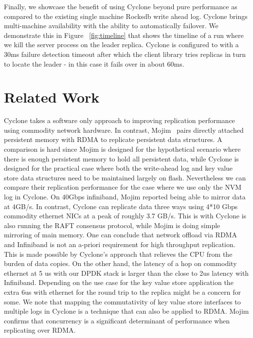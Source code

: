 \documentclass[pageno]{jpaper}
\begin{document}
Finally, we showcase the benefit of using Cyclone beyond pure performance as
compared to the existing single machine Rocksdb write ahead log. Cyclone brings
multi-machine availability with the ability to automatically failover. We
demonstrate this in Figure ~\ref{fig:timeline} that shows the timeline of a run
where we kill the server process on the leader replica. Cyclone is configured to
with a 30ms failure detection timeout after which the client library tries
replicas in turn to locate the leader - in this case it fails over in about
60ms.

\section{Related Work}

Cyclone takes a software only approach to improving replication performance
using commodity network hardware. In contrast, Mojim~\cite{mojim} pairs directly
attached persistent memory with RDMA to replicate persistent data structures. A
comparison is hard since Mojim is designed for the hypothetical scenario where
there is enough persistent memory to hold all persistent data, while Cyclone is
designed for the practical case where both the write-ahead log and key value
store data structures need to be maintained largely on flash. Nevertheless we
can compare their replication performance for the case where we use only the NVM
log in Cyclone. On 40Gbps infiniband, Mojim reported being able to mirror data
at 4GB/s. In contrast, Cyclone can replicate data three ways using 4*10 Gbps
commodity ethernet NICs at a peak of roughly 3.7 GB/s. This is with Cyclone is
also running the RAFT consensus protocol, while Mojim is doing simple mirroring
of main memory. One can conclude that network offload via RDMA and Infiniband is
not an a-priori requirement for high throughput replication. This is made
possible by Cyclone's approach that relieves the CPU from the burden of data
copies. On the other hand, the latency of a hop on commodity ethernet at 5 us
with our DPDK stack is larger than the close to 2us latency with
Infiniband. Depending on the use case for the key value store application the
extra 6us with ethernet for the round trip to the replica might be a concern for
some. We note that mapping the commutativity of key value store interfaces to
multiple logs in Cyclone is a technique that can also be applied to RDMA. Mojim
confirms that concurrency is a significant determinant of performance when
replicating over RDMA.
\end{document}
